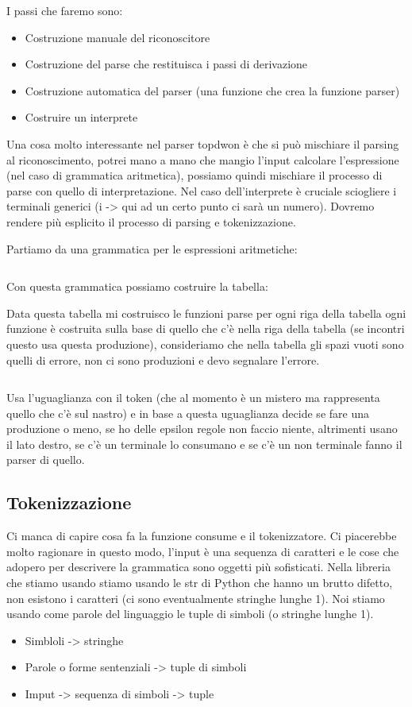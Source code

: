 I passi che faremo sono:
\begin{itemize}
  \item Costruzione manuale del riconoscitore
  \item Costruzione del parse che restituisca i passi di derivazione
  \item Costruzione automatica del parser (una funzione che crea la funzione parser)
  \item Costruire un interprete
\end{itemize}

Una cosa molto interessante nel parser topdwon è che si può mischiare il parsing al riconoscimento, potrei mano a mano che mangio l'input calcolare l'espressione (nel caso di grammatica aritmetica), possiamo quindi mischiare il processo di parse con quello di interpretazione. Nel caso dell'interprete è cruciale sciogliere i terminali generici (i -> qui ad un certo punto ci sarà un numero). Dovremo rendere più esplicito il processo di parsing e tokenizzazione.

Partiamo da una grammatica per le espressioni aritmetiche:
\begin{lstlisting}

\end{lstlisting}

Con questa grammatica possiamo costruire la tabella:


Data questa tabella mi costruisco le funzioni parse per ogni riga della tabella ogni funzione è costruita sulla base di quello che c'è nella riga della tabella (se incontri questo usa questa produzione), consideriamo che nella tabella gli spazi vuoti sono quelli di errore, non ci sono produzioni e devo segnalare l'errore.
\begin{lstlisting}

\end{lstlisting}

Usa l'uguaglianza con il token (che al momento è un mistero ma rappresenta quello che c'è sul nastro) e in base a questa uguaglianza decide se fare una produzione o meno, se ho delle epsilon regole non faccio niente, altrimenti usano il lato destro, se c'è un terminale lo consumano e se c'è un non terminale fanno il parser di quello.

\subsection{Tokenizzazione}
Ci manca di capire cosa fa la funzione consume e il tokenizzatore. Ci piacerebbe molto ragionare in questo modo, l'input è una sequenza di caratteri e le cose che adopero per descrivere la grammatica sono oggetti più sofisticati. Nella libreria che stiamo usando stiamo usando le str di Python che hanno un brutto difetto, non esistono i caratteri (ci sono eventualmente stringhe lunghe 1). Noi stiamo usando come parole del linguaggio le tuple di simboli (o stringhe lunghe 1).
\begin{itemize}
  \item Simbloli -> stringhe
  \item Parole o forme sentenziali -> tuple di simboli
  \item Imput -> sequenza di simboli -> tuple
\end{itemize}

